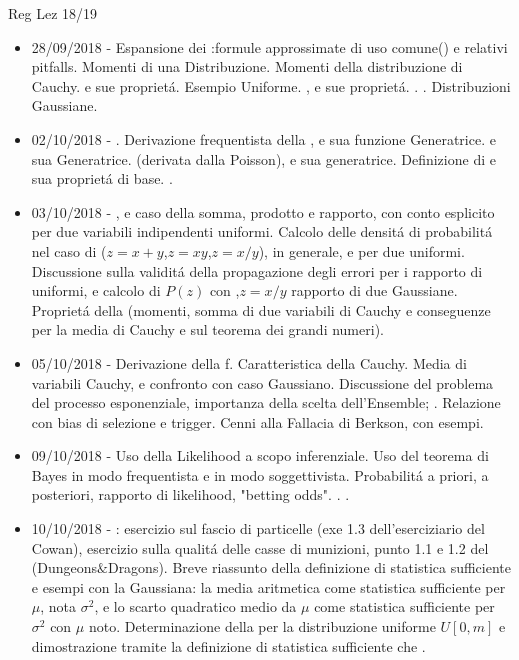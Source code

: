 \begin{frame}[allowframebreaks]{Reg Lez 18/19}
\begin{itemize}
\item 28/09/2018 - Espansione dei :formule approssimate di uso comune() e relativi pitfalls. Momenti di una Distribuzione. Momenti della distribuzione di Cauchy.  e sue propriet\'a. Esempio Uniforme. , e sue propriet\'a. . . Distribuzioni Gaussiane.
\item 02/10/2018 - . Derivazione frequentista della , e sua funzione Generatrice.  e sua Generatrice. (derivata dalla Poisson), e sua generatrice. Definizione di  e sua propriet\'a di base. .
\item 03/10/2018 - , e caso della somma, prodotto e rapporto, con conto esplicito per due variabili indipendenti uniformi. Calcolo delle densit\'a di probabilit\'a nel caso di  ($z=x+y$,$z=xy$,$z=x/y$), in generale, e per due uniformi. Discussione sulla validit\'a della propagazione degli errori per i rapporto di uniformi, e calcolo di $P(z)$ con ,$z=x/y$ rapporto di due Gaussiane. Propriet\'a della  (momenti, somma di due variabili di Cauchy e conseguenze per la media di Cauchy e sul teorema dei grandi numeri).
\item 05/10/2018 - Derivazione della f. Caratteristica della Cauchy. Media di variabili Cauchy, e confronto con caso Gaussiano. Discussione del problema del processo esponenziale, importanza della scelta dell'Ensemble; . Relazione con bias di selezione e trigger. Cenni alla Fallacia di Berkson, con esempi.
\item 09/10/2018 - Uso della Likelihood a scopo inferenziale. Uso del teorema di Bayes in modo frequentista e in modo soggettivista. Probabilit\'a a priori, a posteriori, rapporto di likelihood, "betting odds". . .
\item 10/10/2018 - : esercizio sul fascio di particelle (exe 1.3 dell’eserciziario del Cowan), esercizio sulla qualit\'a delle casse di munizioni, punto 1.1 e 1.2 del  (Dungeons$\&$Dragons). Breve riassunto della definizione di statistica sufficiente e esempi con la Gaussiana: la media aritmetica come statistica sufficiente per $\mu$, nota $\sigma^2$, e lo scarto quadratico medio da $\mu$ come statistica sufficiente per $\sigma^2$ con $\mu$ noto. Determinazione della  per la distribuzione uniforme $U[0,m]$ e dimostrazione tramite la definizione di statistica sufficiente che .

\end{itemize}
\end{frame}

